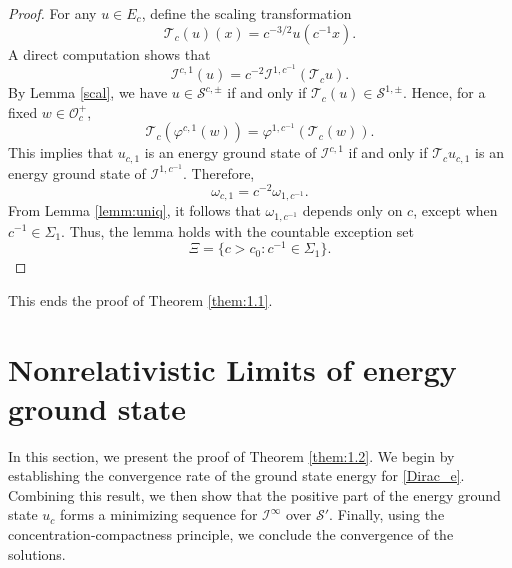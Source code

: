 \documentclass{amsart}
\theoremstyle{plain}
\theoremstyle{definition}
\theoremstyle{remark}
\numberwithin{equation}{section} \numberwithin{figure}{section}
\begin{document}
{          \begin{proof}
          For any $u \in E_c$, define the scaling transformation
          \[
          \mathcal{T}_c(u)(x) = c^{-3/2} u(c^{-1} x).
          \]
          A direct computation shows that
          \[
          \mathcal{I}^{c,1}(u) = c^{-2} \mathcal{I}^{1,c^{-1}}(\mathcal{T}_c u).
          \]
          By Lemma \ref{scal}, we have $u \in \mathcal{S}^{c,\pm}$ if and only if $\mathcal{T}_c(u) \in \mathcal{S}^{1,\pm}$. Hence, for a fixed $w \in \mathcal{O}_c^+$,
          \[
          \mathcal{T}_c(\varphi^{c,1}(w)) = \varphi^{1,c^{-1}}(\mathcal{T}_c(w)).
          \]
          This implies that $u_{c,1}$ is an energy ground state of $\mathcal{I}^{c,1}$ if and only if $\mathcal{T}_c u_{c,1}$ is an energy ground state of $\mathcal{I}^{1,c^{-1}}$. Therefore,
          \[
          \omega_{c,1} = c^{-2} \omega_{1,c^{-1}}.
          \]
          From Lemma \ref{lemm:uniq}, it follows that $\omega_{1,c^{-1}}$ depends only on $c$, except when $c^{-1} \in \Sigma_1$. Thus, the lemma holds with the countable exception set
          \[
          \Xi = \{ c > c_0 : c^{-1} \in \Sigma_1 \}.
          \]
          \end{proof}
This ends the proof of Theorem \ref{them:1.1}.








}








  
\section{Nonrelativistic Limits  of energy ground state}\label{section4}

In this section, we present the proof of Theorem \ref{them:1.2}. We begin by establishing 
the convergence rate of the ground state energy for \eqref{Dirac_e}. Combining this result, 
we then show that the positive part of the energy ground state \(u_c\) forms a minimizing 
sequence for \(\mathcal{I}^\infty\) over \(\mathcal{S}'\). Finally, using the concentration-compactness principle, 
we conclude the convergence of the solutions.



\end{document}
